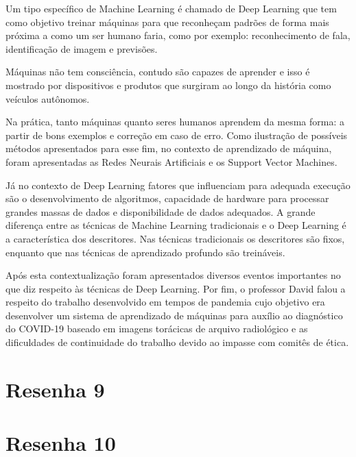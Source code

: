\documentclass[
	12pt,				%
	openright,			%
	twoside,			%
	a4paper,			%
	english,			%
	brazil,				%
	svgnames
	]{abntex2}\usepackage[]{graphicx}\usepackage[]{color}
\begin{document}
Um tipo específico de Machine Learning é chamado de Deep Learning que tem como objetivo treinar máquinas para que reconheçam padrões de forma mais próxima a como um ser humano faria, como por exemplo: reconhecimento de fala, identificação de imagem e previsões.

Máquinas não tem consciência, contudo são capazes de aprender e isso é mostrado por dispositivos e produtos que surgiram ao longo da história como veículos autônomos. 

Na prática, tanto máquinas quanto seres humanos aprendem da mesma forma: a partir de bons exemplos e correção em caso de erro. Como ilustração de possíveis métodos apresentados para esse fim, no contexto de aprendizado de máquina, foram apresentadas as Redes Neurais Artificiais e os Support Vector Machines. 

Já no contexto de Deep Learning fatores que influenciam para adequada execução são o desenvolvimento de algoritmos, capacidade de hardware para processar grandes massas de dados e disponibilidade de dados adequados. A grande diferença entre as técnicas de Machine Learning tradicionais e o Deep Learning é a característica dos descritores. Nas técnicas tradicionais os descritores são fixos, enquanto que nas técnicas de aprendizado profundo são treináveis.

Após esta contextualização foram apresentados diversos eventos importantes no que diz respeito às técnicas de Deep Learning. Por fim, o professor David falou a respeito do trabalho desenvolvido em tempos de pandemia cujo objetivo era desenvolver um sistema de aprendizado de máquinas para auxílio ao diagnóstico do COVID-19 baseado em imagens torácicas de arquivo radiológico e as dificuldades de continuidade do trabalho devido ao impasse com comitês de ética.





\chapter{Resenha 9}
\label{cap:res9}

% 


\chapter{Resenha 10}
\label{cap:res10}
\end{document}
